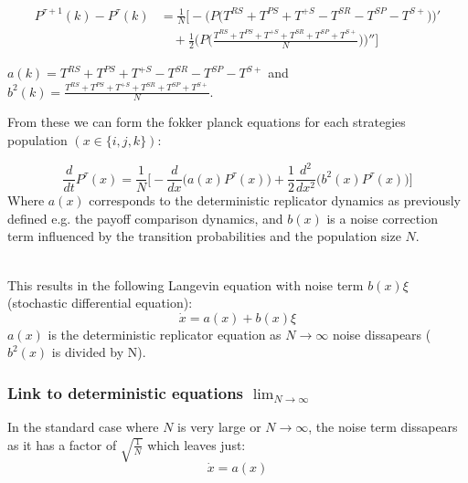 \documentclass[./main.tex]{subfiles}
\begin{document}
\begin{equation}
\begin{aligned}
P^{\tau+1}(k)-P^\tau(k)
&=\frac{1}{N}\Big[
    -\big(P\big(
          T^{RS} + T^{PS} + T^{+S}
        - T^{SR} - T^{SP} - T^{S+}
      \big)\big)'
\\[6pt]
&\quad
 + \frac{1}{2}\big(
      P\big(\frac{T^{RS}+T^{PS}+T^{+S} + T^{SR} +T^{SP}+T^{S+}}{N}\big)
    \big)'' \Big]
\end{aligned}
\end{equation}

\hfill

$a(k) = T^{RS} + T^{PS} + T^{+S} - T^{SR} - T^{SP} - T^{S+}$ and $b^2(k) = \frac{T^{RS}+T^{PS}+T^{+S} + T^{SR} +T^{SP}+T^{S+}}{N}$. 

\hfill

\par \noindent
From these we can form the fokker planck equations for each strategies population $(x \in \{i,j,k\})$:

\begin{equation}
  \frac{d}{dt}P^\tau(x) = \frac{1}{N}\Big[-\frac{d}{d x}\big(a(x)P^\tau(x) \big) + \frac{1}{2} \frac{d^2}{d x^2}\big(b^2(x)P^\tau(x) \big)\Big]
\end{equation}
Where $a(x)$ corresponds to the deterministic replicator dynamics
as previously defined e.g. the payoff comparison dynamics, and 
$b(x)$ is a noise correction term influenced by the 
transition probabilities and the population size $N$.

\hfill
\\
\noindent This results in the following Langevin equation
with noise term $b(x)\xi$ (stochastic differential equation):
\begin{equation}
  \dot{x} = a(x) + b(x)\xi
\end{equation}
$a(x)$ is the deterministic replicator equation as $N \rightarrow \infty$ noise dissapears ($b^2(x)$ is divided by N).


\subsubsection{Link to deterministic equations $\lim_{N\to\infty}$}



In the standard case where $N$ is very large or $N \rightarrow \infty$, 
the noise term dissapears as it has a factor of $\sqrt{\frac{1}{N}}$
which leaves just:
\begin{equation}
\dot{x} = a(x)
\end{equation}
\end{document}
